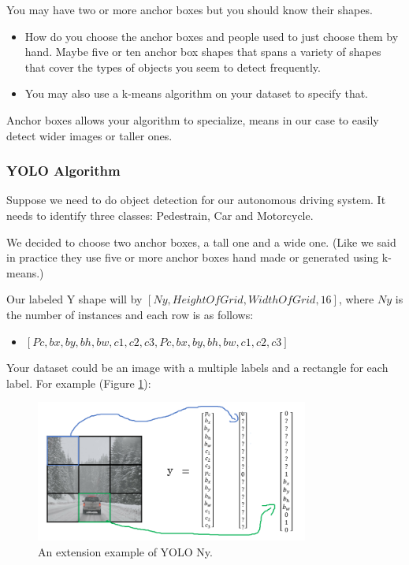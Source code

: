You may have two or more anchor boxes but you should know their shapes.

\begin{itemize}
    \item How do you choose the anchor boxes and people used to just choose them by hand. Maybe five or ten anchor box shapes that spans a variety of shapes that cover the types of objects you seem to detect frequently.
    \item You may also use a k-means algorithm on your dataset to specify that.
\end{itemize}

Anchor boxes allows your algorithm to specialize, means in our case to easily detect wider images or taller ones.

\subsubsection{YOLO Algorithm}
Suppose we need to do object detection for our autonomous driving system. It needs to identify three classes: Pedestrain, Car and Motorcycle.

We decided to choose two anchor boxes, a tall one and a wide one. (Like we said in practice they use five or more anchor boxes hand made or generated using k-means.)

Our labeled Y shape will by $[Ny, HeightOfGrid, WidthOfGrid, 16]$, where $Ny$ is the number of instances and each row is as follows:

\begin{itemize}
    \item $[Pc, bx, by, bh, bw, c1, c2, c3, Pc, bx, by, bh, bw, c1, c2, c3]$
\end{itemize}

Your dataset could be an image with a multiple labels and a rectangle for each label. For example (Figure \ref{yolo2}):

\begin{figure}
    \centering
    \includegraphics[width=0.8\textwidth]{img/c4/yolo2.png}
    \caption{An extension example of YOLO Ny.}
    \label{yolo2}
\end{figure}

